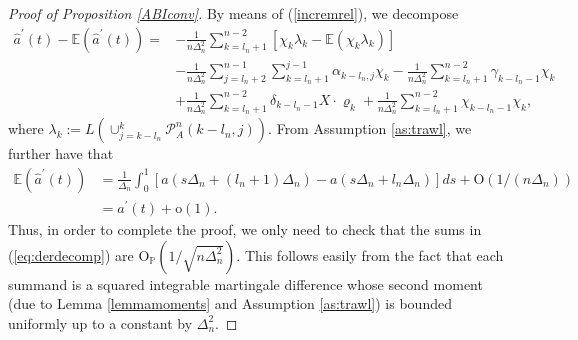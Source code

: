 \documentclass{article}
\theoremstyle{plain}
\theoremstyle{definition}
\theoremstyle{remark}
\begin{document}
\begin{appendix}
\begin{proof}[Proof of Proposition \ref{ABIconv}]
	By means of (\ref{incremrel}), we decompose 
	\begin{equation}
		\begin{aligned}\hat{a}^{\prime}(t)-\mathbb{E}(\hat{a}^{\prime}(t))= & -\frac{1}{n\Delta_{n}^{2}}\sum_{k=l_{n}+1}^{n-2}\left[\chi_{k}\lambda_{k}-\mathbb{E}(\chi_{k}\lambda_{k})\right]\\
			& -\frac{1}{n\Delta_{n}^{2}}\sum_{j=l_{n}+2}^{n-1}\sum_{k=l_{n}+1}^{j-1}\alpha_{k-l_{n},j}\chi_{k}-\frac{1}{n\Delta_{n}^{2}}\sum_{k=l_{n}+1}^{n-2}\gamma_{k-l_{n}-1}\chi_{k}\\
			& +\frac{1}{n\Delta_{n}^{2}}\sum_{k=l_{n}+1}^{n-2}\delta_{k-l_{n}-1}X\cdot\varrho_{k}+\frac{1}{n\Delta_{n}^{2}}\sum_{k=l_{n}+1}^{n-2}\chi_{k-l_{n}-1}\chi_{k},
		\end{aligned}
		\label{eq:derdecomp}
	\end{equation}
	where $\lambda_{k}:=L(\cup_{j=k-l_{n}}^{k}\mathcal{P}_{A}^{n}(k-l_{n},j))$.
	From Assumption \ref{as:trawl}, we further have that
	\begin{align*}
		\mathbb{E}(\hat{a}^{\prime}(t)) & =\frac{1}{\Delta_{n}}\int_{0}^{1}[a(s\Delta_{n}+(l_{n}+1)\Delta_{n})-a(s\Delta_{n}+l_{n}\Delta_{n})]ds+\mathrm{O}(1/(n\Delta_{n}))\\
		& =a^{\prime}(t)+\mathrm{o}(1).
	\end{align*}
	Thus, in order to complete the proof, we only need to check that the sums in
	(\ref{eq:derdecomp}) are $\mathrm{O}_{\mathbb{P}}(1/\sqrt{n\Delta_{n}^{2}})$.
	This follows easily from the fact that each summand is a squared integrable martingale
	difference whose second moment (due to Lemma \ref{lemmamoments} and Assumption \ref{as:trawl}) is bounded uniformly up to a constant
	by $\Delta_{n}^{2}$.\end{proof}


\end{appendix}
\end{document}
